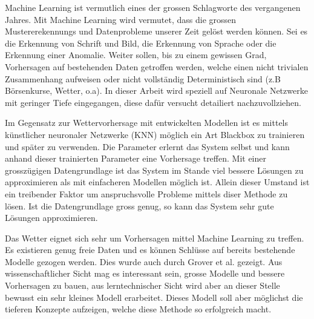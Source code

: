 
	Machine Learning ist vermutlich eines der grossen Schlagworte des vergangenen Jahres. Mit Machine Learning wird vermutet, dass die grossen Mustererekennungs und Datenprobleme unserer Zeit gelöst werden können. Sei es die Erkennung von Schrift und Bild, die Erkennung von Sprache oder die Erkennung einer Anomalie. Weiter sollen, bis zu einem gewissen Grad, Vorhersagen auf bestehenden Daten getroffen werden, welche einen nicht trivialen Zusammenhang aufweisen oder nicht vollständig Deterministisch sind (z.B Börsenkurse, Wetter, o.a). In dieser Arbeit wird speziell auf Neuronale Netzwerke mit geringer Tiefe eingegangen, diese dafür versucht detailiert nachzuvollziehen.
	

	Im Gegensatz zur Wettervorhersage mit entwickelten Modellen ist es mittels künstlicher neuronaler Netzwerke (KNN) möglich ein Art Blackbox zu trainieren und später zu verwenden. Die Parameter erlernt das System selbst und kann anhand dieser trainierten Parameter eine Vorhersage treffen. Mit einer grosszügigen Datengrundlage ist das System im Stande viel bessere Lösungen zu approximieren als mit einfacheren Modellen möglich ist. Allein dieser Umstand ist ein treibender Faktor um anspruchsvolle Probleme mittels diser Methode zu lösen. Ist die Datengrundlage gross genug, so kann das System sehr gute Lösungen approximieren.
	
	Das Wetter eignet sich sehr um Vorhersagen mittel Machine Learning zu treffen. Es existieren genug freie Daten und es können Schlüsse auf bereits bestehende Modelle gezogen werden. Dies wurde auch durch Grover et al. gezeigt. %
	Aus wissenschaftlicher Sicht mag es interessant sein, grosse Modelle und bessere Vorhersagen zu bauen, aus lerntechnischer Sicht wird aber an dieser Stelle bewusst ein sehr kleines Modell erarbeitet. Dieses Modell soll aber möglichst die tieferen Konzepte aufzeigen, welche diese Methode so erfolgreich macht.
	
